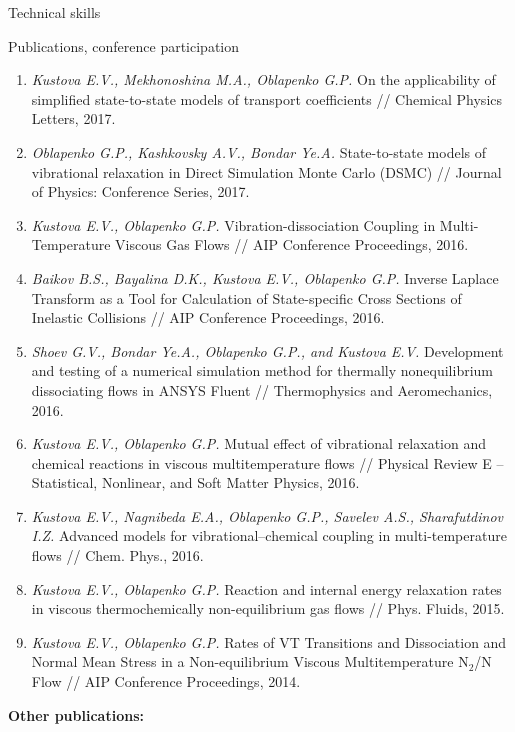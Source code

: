 \documentclass{resume} %
\begin{document}
\begin{rSection}{Technical skills}
\begin{rSection}{Publications, conference participation}
\begin{enumerate}
\item \emph{Kustova E.V., Mekhonoshina M.A., Oblapenko G.P.} On the applicability of simplified state-to-state models of transport coefficients // Chemical Physics Letters, 2017.

\item \emph{Oblapenko G.P., Kashkovsky A.V., Bondar Ye.A.} State-to-state models of vibrational relaxation in Direct Simulation Monte Carlo (DSMC) // Journal of Physics: Conference Series, 2017.

\item  \emph{Kustova E.V., Oblapenko G.P.} Vibration-dissociation Coupling in Multi-Temperature Viscous Gas Flows // AIP Conference Proceedings, 2016.

\item  \emph{Baikov B.S., Bayalina D.K., Kustova E.V., Oblapenko G.P.} Inverse Laplace Transform as a Tool for Calculation of State-specific Cross Sections of Inelastic Collisions // AIP Conference Proceedings, 2016.

\item  \emph{Shoev G.V., Bondar Ye.A., Oblapenko G.P., and Kustova E.V.} Development and testing of a numerical simulation method for thermally nonequilibrium dissociating flows in ANSYS Fluent // Thermophysics and Aeromechanics, 2016.

\item  \emph{Kustova E.V., Oblapenko G.P.} Mutual effect of vibrational relaxation and chemical reactions in viscous multitemperature flows // Physical Review E -- Statistical, Nonlinear, and Soft Matter Physics, 2016.

\item  \emph{Kustova E.V., Nagnibeda E.A., Oblapenko G.P., Savelev A.S., Sharafutdinov I.Z.} Advanced models for vibrational–chemical coupling in multi-temperature flows // Chem. Phys., 2016.

\item  \emph{Kustova E.V., Oblapenko G.P.} Reaction and internal energy relaxation rates in viscous thermochemically non-equilibrium gas flows // Phys. Fluids, 2015.

\item  \emph{Kustova E.V., Oblapenko G.P.} Rates of VT Transitions and Dissociation and Normal Mean Stress in a Non-equilibrium Viscous Multitemperature N$_2$/N Flow // AIP Conference Proceedings, 2014.


\end{enumerate}


{\bf Other publications:}


\end{rSection}
\end{rSection}
\end{document}
